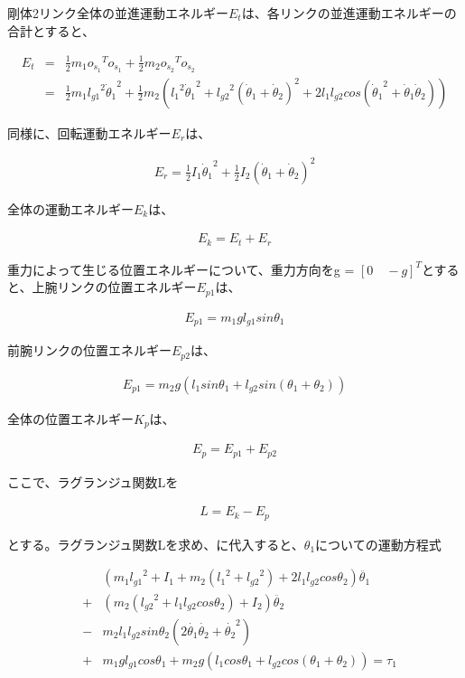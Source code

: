 剛体2リンク全体の並進運動エネルギー$E_{t}$は、各リンクの並進運動エネルギーの合計とすると、

\begin{eqnarray}
  E_{t}
  &=&\frac{1}{2}m_{1}o_{\dot{s}_{1}}{}^T\!o_{\dot{s}_{1}} + \frac{1}{2}m_{2}o_{\dot{s}_{2}}{}^T\!o_{\dot{s}_{2}} \nonumber \\
  &=&\frac{1}{2}m_{1}{l_{g1}}^2{\dot{\theta}_{1}}^2 + \frac{1}{2}m_{2}({{l_{1}}^2}{\dot{\theta}_{1}}^2 + {l_{g2}}^2(\dot{\theta}_{1} + \dot{\theta}_{2})^2 + 2{l_{1}}{l_{g2}}cos({\dot{\theta}_{1}}^2 + \dot{\theta}_{1}\dot{\theta}_{2}))
\end{eqnarray}

同様に、回転運動エネルギー$E_{r}$は、

\begin{eqnarray}
  E_{r}
  =\frac{1}{2}I_{1}{\dot{\theta}_{1}}^2 + \frac{1}{2}I_{2}(\dot{\theta}_{1} + \dot{\theta}_{2})^2
\end{eqnarray}

全体の運動エネルギー$E_{k}$は、

\begin{eqnarray}
  E_{k}
  =E_{t} + E_{r}
\end{eqnarray}

重力によって生じる位置エネルギーについて、重力方向をg = ${[0 \quad -g]}^T$とすると、上腕リンクの位置エネルギー$E_{p1}$は、

\begin{eqnarray}
  E_{p1}
  =m_{1}gl_{g1}sin\theta_{1}
\end{eqnarray}

前腕リンクの位置エネルギー$E_{p2}$は、

\begin{eqnarray}
  E_{p1}
  =m_{2}g(l_{1}sin\theta_{1} + l_{g2}sin(\theta_{1} + \theta_{2}))
\end{eqnarray}

全体の位置エネルギー$K_{p}$は、

\begin{eqnarray}
  E_{p}
  =E_{p1} + E_{p2}
\end{eqnarray}

ここで、ラグランジュ関数Lを

\begin{eqnarray}
  L
  =E_{k} - E_{p}
\end{eqnarray}

とする。ラグランジュ関数Lを求め、に代入すると、$\theta_{1}$についての運動方程式

\begin{eqnarray}
  &&(m_{1}{l_{g1}}^2 + I_{1} + m_{2}({l_{1}}^2 + {l_{g2}}^2)
  + 2l_{1}l_{g2}cos\theta_{2})\ddot{\theta_{1}} \nonumber \\
  &+& (m_{2}({l_{g2}}^2 + l_{1}l_{g2}cos\theta_{2}) + I_{2})\ddot{\theta_{2}} \nonumber \\
  &-& m_{2}l_{1}l_{g2}sin\theta_{2}(2\dot{\theta_{1}}\dot{\theta_{2}} + {\dot{\theta_{2}}}^2)  \nonumber \\
  &+& m_{1}gl_{g1}cos\theta_{1} + m_{2}g(l_{1}cos\theta_{1} + l_{g2}cos(\theta_{1} + \theta_{2})) = \tau_{1}
\end{eqnarray}

